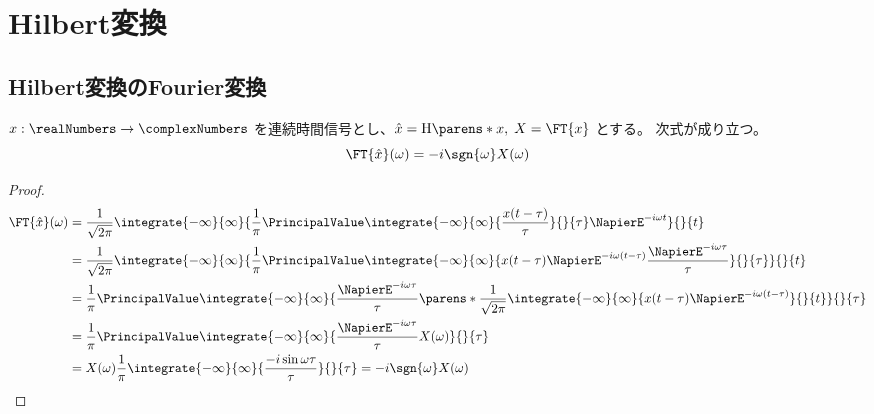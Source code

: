 \part{Hilbert変換}
    \newcommand{\HilbertTransform}[1]{\mathrm{H}\parens*{#1}}
    \chapter{Hilbert変換のFourier変換}
        \begin{shadebox}
            $x:\realNumbers\to\complexNumbers$ を連続時間信号とし、$\hat{x} = \HilbertTransform{x},\;X = \FT{x}$ とする。
            次式が成り立つ。
            \[ \FT{\hat{x}}(\omega) = -i\sgn{\omega}X(\omega) \]
        \end{shadebox}
        \begin{proof}
            \begin{align*}
                \FT{\hat{x}}(\omega) &= \frac{1}{\sqrt{2\pi}}\integrate{-\infty}{\infty}{\frac{1}{\pi}\PrincipalValue\integrate{-\infty}{\infty}{\frac{x(t-\tau)}{\tau}}{}{\tau}\NapierE^{-i\omega t}}{}{t} \\
                &= \frac{1}{\sqrt{2\pi}}\integrate{-\infty}{\infty}{\frac{1}{\pi}\PrincipalValue\integrate{-\infty}{\infty}{x(t-\tau)\NapierE^{-i\omega(t-\tau)}\frac{\NapierE^{-i\omega \tau}}{\tau}}{}{\tau}}{}{t} \\
                &= \frac{1}{\pi}\PrincipalValue\integrate{-\infty}{\infty}{\frac{\NapierE^{-i\omega \tau}}{\tau}\parens*{\frac{1}{\sqrt{2\pi}}\integrate{-\infty}{\infty}{x(t-\tau)\NapierE^{-i\omega(t-\tau)}}{}{t}}}{}{\tau} \\
                &= \frac{1}{\pi}\PrincipalValue\integrate{-\infty}{\infty}{\frac{\NapierE^{-i\omega \tau}}{\tau}X(\omega)}{}{\tau} \\
                &= X(\omega)\frac{1}{\pi}\integrate{-\infty}{\infty}{\frac{-i\sin\omega\tau}{\tau}}{}{\tau} = -i\sgn{\omega}X(\omega)
            \end{align*}
        \end{proof}